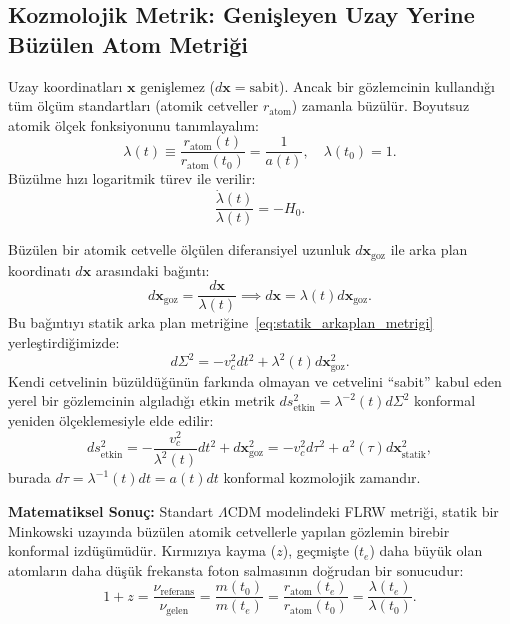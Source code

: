 \subsection{Kozmolojik Metrik: Genişleyen Uzay Yerine Büzülen Atom Metriği}
Uzay koordinatları $\mathbf{x}$ geni\c{s}lemez ($d\mathbf{x} = \text{sabit}$). Ancak bir gözlemcinin kullandığı tüm ölçüm standartları (atomik cetveller $r_{\mathrm{atom}}$) zamanla büzülür. Boyutsuz atomik ölçek fonksiyonunu tanımlayalım:
\begin{equation}
    \lambda(t) \equiv \frac{r_{\mathrm{atom}}(t)}{r_{\mathrm{atom}}(t_0)} = \frac{1}{a(t)}, \quad \lambda(t_0) = 1.
    \label{eq:olcek_fonksiyonu}
\end{equation}
Büzülme hızı logaritmik türev ile verilir:
\begin{equation}
    \frac{\dot{\lambda}(t)}{\lambda(t)} = -H_0.
    \label{eq:buzulme_hubble}
\end{equation}

Büzülen bir atomik cetvelle ölçülen diferansiyel uzunluk $d\mathbf{x}_{\mathrm{goz}}$ ile arka plan koordinatı $d\mathbf{x}$ arasındaki bağıntı:
\begin{equation}
    d\mathbf{x}_{\mathrm{goz}} = \frac{d\mathbf{x}}{\lambda(t)} \implies d\mathbf{x} = \lambda(t) d\mathbf{x}_{\mathrm{goz}}.
    \label{eq:cetvel_donusumu}
\end{equation}
Bu bağıntıyı statik arka plan metriğine~\eqref{eq:statik_arkaplan_metrigi} yerleştirdiğimizde:
\begin{equation}
    d\Sigma^2 = -v_c^2 dt^2 + \lambda^2(t) d\mathbf{x}_{\mathrm{goz}}^2.
    \label{eq:buzulen_cetvel_metrigi}
\end{equation}
Kendi cetvelinin büzüldüğünün farkında olmayan ve cetvelini ``sabit'' kabul eden yerel bir gözlemcinin algıladığı etkin metrik $ds_{\mathrm{etkin}}^2 = \lambda^{-2}(t) d\Sigma^2$ konformal yeniden ölçeklemesiyle elde edilir:
\begin{equation}
    ds_{\mathrm{etkin}}^2 = -\frac{v_c^2}{\lambda^2(t)} dt^2 + d\mathbf{x}_{\mathrm{goz}}^2 = -v_c^2 d\tau^2 + a^2(\tau) d\mathbf{x}_{\mathrm{statik}}^2,
    \label{eq:etkin_flrw}
\end{equation}
burada $d\tau = \lambda^{-1}(t) dt = a(t) dt$ konformal kozmolojik zamandır.

\textbf{Matematiksel Sonuç:} Standart $\Lambda$CDM modelindeki FLRW metriği, statik bir Minkowski uzayında büzülen atomik cetvellerle yapılan gözlemin birebir konformal izdüşümüdür. Kırmızıya kayma ($z$), geçmişte ($t_e$) daha büyük olan atomların daha düşük frekansta foton salmasının doğrudan bir sonucudur:
\begin{equation}
    1 + z = \frac{\nu_{\mathrm{referans}}}{\nu_{\mathrm{gelen}}} = \frac{m(t_0)}{m(t_e)} = \frac{r_{\mathrm{atom}}(t_e)}{r_{\mathrm{atom}}(t_0)} = \frac{\lambda(t_e)}{\lambda(t_0)}.
    \label{eq:bizim_redshift}
\end{equation}

